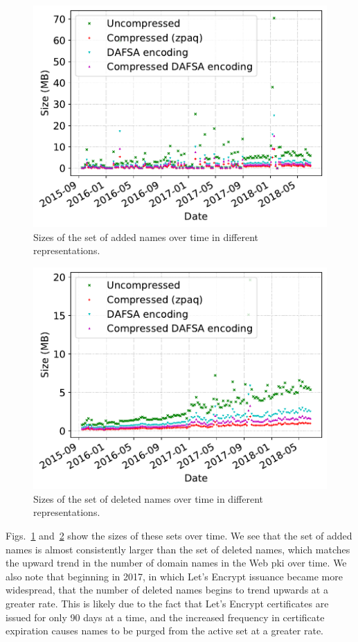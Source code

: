 \begin{figure}[t]
  \centering
  \includegraphics[width=0.95\linewidth]{fig/added_name_set_size}
  \caption{Sizes of the set of added names over time in different
  representations.}
  \label{fig:updates:added}
\end{figure}

\begin{figure}[t]
  \centering
  \includegraphics[width=0.95\linewidth]{fig/deleted_name_set_size}
  \caption{Sizes of the set of deleted names over time in different
  representations.}
  \label{fig:updates:deleted}
\end{figure}

Figs.~\ref{fig:updates:added} and~\ref{fig:updates:deleted} show the sizes of
these sets over time. We see that the set of added names is almost consistently
larger than the set of deleted names, which matches the upward trend in the
number of domain names in the Web \ac{pki} over time. We also note that
beginning in 2017, in which Let's Encrypt issuance became more widespread, that
the number of deleted names begins to trend upwards at a greater rate. This is
likely due to the fact that Let's Encrypt certificates are issued for only 90
days at a time, and the increased frequency in certificate expiration causes
names to be purged from the active set at a greater rate.

